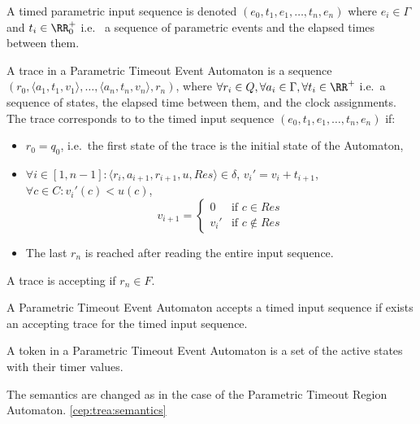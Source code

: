 		\begin{dfn}
			\label{dfn:cep:ptea:inputseq}
			A timed parametric input sequence is denoted $(e_0, t_1, e_1, \dots, t_n, e_n)$ where $e_i \in \Gamma$ and $t_i \in \RR^+_0$ i.e.~ a sequence of parametric events and the elapsed times between them.
		\end{dfn}
		
		\begin{dfn}
			\label{dfn:cep:ptea:trace}

			A trace in a Parametric Timeout Event Automaton is a sequence
			$(r_0, \langle a_1, t_1, v_1\rangle, \dots, \langle a_n, t_n, v_n \rangle, r_n)$, where $\forall r_i \in Q, \forall a_i \in \Gamma, \forall t_i \in \RR^+$ i.e.~a sequence of states, the elapsed time between them, and the clock assignments. The trace corresponds to to the timed input sequence $(e_0, t_1, e_1, \dots, t_n, e_n)$ if:
			\begin{itemize}
				\item $r_0 = q_0$, i.e.~the first state of the trace is the initial state of the Automaton,
				\item $\forall i \in [1,n - 1] \colon \langle r_i, a_{i+1}, r_{i+1}, u, \mathit{Res} \rangle \in \delta$, 
				${v_i}' = v_i + t_{i+1}$, $\forall c \in C \colon {v_i}'(c) < u(c)$,\\
				$$v_{i+1} = \begin{cases}
				0      & \text{if\ } c \in    \mathit{Res} \\
				{v_i}' & \text{if\ } c \notin \mathit{Res}
				\end{cases}$$
				\item The last $r_n$ is reached after reading the entire input sequence.	
			\end{itemize}
			A trace is accepting if $r_n \in F$.
		\end{dfn}
		
		\begin{dfn}
			\label{dfn:cep:ptea:accepting}
			A Parametric Timeout Event Automaton accepts a timed input sequence if exists an accepting trace for the timed input sequence.
		\end{dfn}
		
		\begin{dfn}
			\label{dfn:cep:ptea:token}
			A token in a Parametric Timeout Event Automaton is a set of the active states with their timer values.
		\end{dfn}
		
The semantics are changed as in the case of the Parametric Timeout Region Automaton. \cref{cep:trea:semantics}
		
